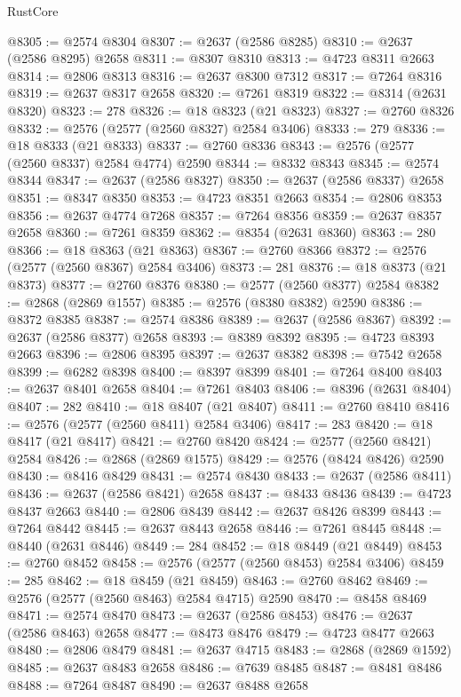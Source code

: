 \begin{lexlean}{RustCore}
\begin{coremodule}
@8305 := @2574 @8304
@8307 := @2637 (@2586 @8285)
@8310 := @2637 (@2586 @8295) @2658
@8311 := @8307 @8310
@8313 := @4723 @8311 @2663
@8314 := @2806 @8313
@8316 := @2637 @8300 @7312
@8317 := @7264 @8316
@8319 := @2637 @8317 @2658
@8320 := @7261 @8319
@8322 := @8314 (@2631 @8320)
@8323 := 278
@8326 := @18 @8323 (@21 @8323)
@8327 := @2760 @8326
@8332 := @2576 (@2577 (@2560 @8327) @2584 @3406)
@8333 := 279
@8336 := @18 @8333 (@21 @8333)
@8337 := @2760 @8336
@8343 := @2576 (@2577 (@2560 @8337) @2584 @4774) @2590
@8344 := @8332 @8343
@8345 := @2574 @8344
@8347 := @2637 (@2586 @8327)
@8350 := @2637 (@2586 @8337) @2658
@8351 := @8347 @8350
@8353 := @4723 @8351 @2663
@8354 := @2806 @8353
@8356 := @2637 @4774 @7268
@8357 := @7264 @8356
@8359 := @2637 @8357 @2658
@8360 := @7261 @8359
@8362 := @8354 (@2631 @8360)
@8363 := 280
@8366 := @18 @8363 (@21 @8363)
@8367 := @2760 @8366
@8372 := @2576 (@2577 (@2560 @8367) @2584 @3406)
@8373 := 281
@8376 := @18 @8373 (@21 @8373)
@8377 := @2760 @8376
@8380 := @2577 (@2560 @8377) @2584
@8382 := @2868 (@2869 @1557)
@8385 := @2576 (@8380 @8382) @2590
@8386 := @8372 @8385
@8387 := @2574 @8386
@8389 := @2637 (@2586 @8367)
@8392 := @2637 (@2586 @8377) @2658
@8393 := @8389 @8392
@8395 := @4723 @8393 @2663
@8396 := @2806 @8395
@8397 := @2637 @8382
@8398 := @7542 @2658
@8399 := @6282 @8398
@8400 := @8397 @8399
@8401 := @7264 @8400
@8403 := @2637 @8401 @2658
@8404 := @7261 @8403
@8406 := @8396 (@2631 @8404)
@8407 := 282
@8410 := @18 @8407 (@21 @8407)
@8411 := @2760 @8410
@8416 := @2576 (@2577 (@2560 @8411) @2584 @3406)
@8417 := 283
@8420 := @18 @8417 (@21 @8417)
@8421 := @2760 @8420
@8424 := @2577 (@2560 @8421) @2584
@8426 := @2868 (@2869 @1575)
@8429 := @2576 (@8424 @8426) @2590
@8430 := @8416 @8429
@8431 := @2574 @8430
@8433 := @2637 (@2586 @8411)
@8436 := @2637 (@2586 @8421) @2658
@8437 := @8433 @8436
@8439 := @4723 @8437 @2663
@8440 := @2806 @8439
@8442 := @2637 @8426 @8399
@8443 := @7264 @8442
@8445 := @2637 @8443 @2658
@8446 := @7261 @8445
@8448 := @8440 (@2631 @8446)
@8449 := 284
@8452 := @18 @8449 (@21 @8449)
@8453 := @2760 @8452
@8458 := @2576 (@2577 (@2560 @8453) @2584 @3406)
@8459 := 285
@8462 := @18 @8459 (@21 @8459)
@8463 := @2760 @8462
@8469 := @2576 (@2577 (@2560 @8463) @2584 @4715) @2590
@8470 := @8458 @8469
@8471 := @2574 @8470
@8473 := @2637 (@2586 @8453)
@8476 := @2637 (@2586 @8463) @2658
@8477 := @8473 @8476
@8479 := @4723 @8477 @2663
@8480 := @2806 @8479
@8481 := @2637 @4715
@8483 := @2868 (@2869 @1592)
@8485 := @2637 @8483 @2658
@8486 := @7639 @8485
@8487 := @8481 @8486
@8488 := @7264 @8487
@8490 := @2637 @8488 @2658

\end{coremodule}
\end{lexlean}
